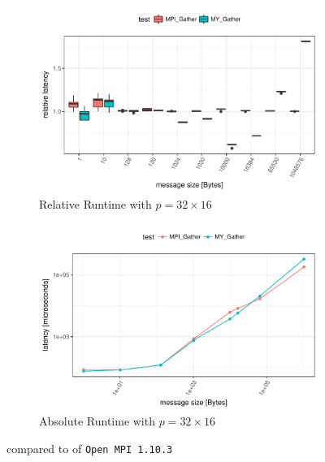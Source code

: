 \begin{figure}[h]
    \begin{subfigure}[b]{0.49\textwidth}
        \includegraphics[width=\textwidth]{../benchmarks/openmpi/binom/gather_32/rel_runtime.pdf}
        \caption{Relative Runtime with $p=32 \times 16$}
        \label{fig:Gather:OpenMPI:Rel:32}
    \end{subfigure}
    \begin{subfigure}[b]{0.49\textwidth}
        \includegraphics[width=\textwidth]{../benchmarks/openmpi/binom/gather_32/runtime.pdf}
        \caption{Absolute Runtime with $p=32 \times 16$}
        \label{fig:Gather:OpenMPI:Abs:32}
    \end{subfigure}
    
    \caption{\mygather compared to \mpigather of \texttt{Open MPI 1.10.3}}
\end{figure}

